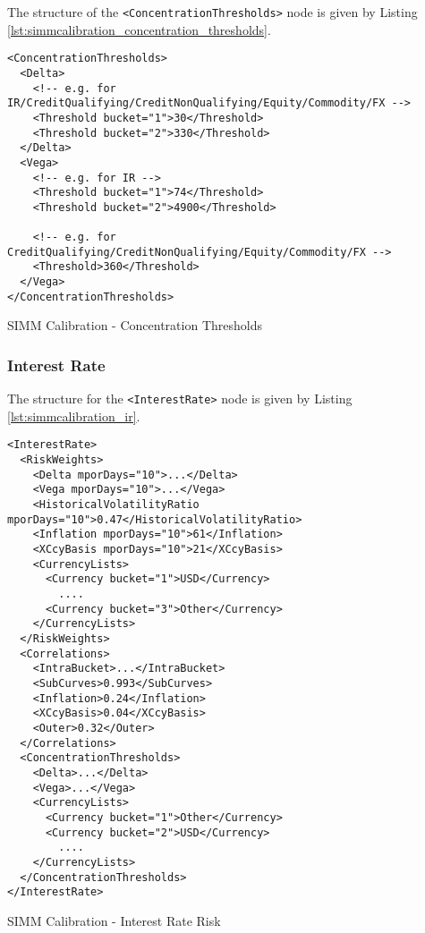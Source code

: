 The structure of the {\tt <ConcentrationThresholds>} node is given by Listing \ref{lst:simmcalibration_concentration_thresholds}.

\begin{listing}[H]
\begin{verbatim}
<ConcentrationThresholds>
  <Delta>
    <!-- e.g. for IR/CreditQualifying/CreditNonQualifying/Equity/Commodity/FX -->
    <Threshold bucket="1">30</Threshold>
    <Threshold bucket="2">330</Threshold>
  </Delta>
  <Vega>
    <!-- e.g. for IR -->
    <Threshold bucket="1">74</Threshold>
    <Threshold bucket="2">4900</Threshold>

    <!-- e.g. for CreditQualifying/CreditNonQualifying/Equity/Commodity/FX -->
    <Threshold>360</Threshold>
  </Vega>
</ConcentrationThresholds>
\end{verbatim}
\caption{SIMM Calibration - Concentration Thresholds}
\label{lst:simmcalibration_concentration_thresholds}
\end{listing}

\subsubsection{Interest Rate}
The structure for the {\tt <InterestRate>} node is given by Listing \ref{lst:simmcalibration_ir}.

\begin{listing}[H]
\begin{verbatim}
<InterestRate>
  <RiskWeights>
    <Delta mporDays="10">...</Delta>
    <Vega mporDays="10">...</Vega>
    <HistoricalVolatilityRatio mporDays="10">0.47</HistoricalVolatilityRatio>
    <Inflation mporDays="10">61</Inflation>
    <XCcyBasis mporDays="10">21</XCcyBasis>
    <CurrencyLists>
      <Currency bucket="1">USD</Currency>
        ....
      <Currency bucket="3">Other</Currency>
    </CurrencyLists>
  </RiskWeights>
  <Correlations>
    <IntraBucket>...</IntraBucket>
    <SubCurves>0.993</SubCurves>
    <Inflation>0.24</Inflation>
    <XCcyBasis>0.04</XCcyBasis>
    <Outer>0.32</Outer>
  </Correlations>
  <ConcentrationThresholds>
    <Delta>...</Delta>
    <Vega>...</Vega>
    <CurrencyLists>
      <Currency bucket="1">Other</Currency>
      <Currency bucket="2">USD</Currency>
        ....
    </CurrencyLists>
  </ConcentrationThresholds>
</InterestRate>
\end{verbatim}
\caption{SIMM Calibration - Interest Rate Risk}
\label{lst:simmcalibration_ir}
\end{listing}

